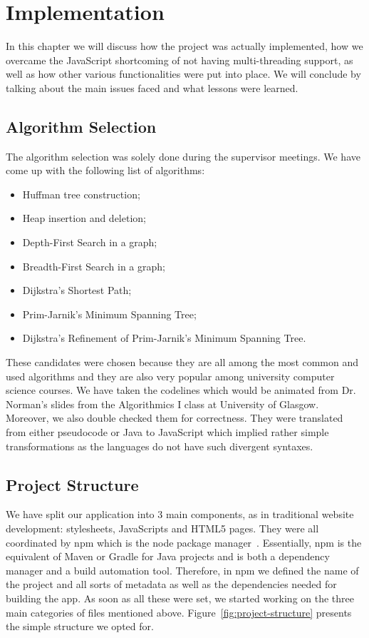 \documentclass{l4proj}
\begin{document}
\chapter{Implementation}
\label{implementation}

In this chapter we will discuss how the project was actually implemented, how we overcame the
JavaScript shortcoming of not having multi-threading support, as well as how other various functionalities were put
into place. We will conclude by talking about the main issues faced and what lessons were learned. 

\section{Algorithm Selection}

The algorithm selection was solely done during the supervisor meetings. We have come up with the following list of algorithms:

\begin{itemize}
    \item Huffman tree construction;
    \item Heap insertion and deletion;
    \item Depth-First Search in a graph;
    \item Breadth-First Search in a graph;
    \item Dijkstra's Shortest Path;
    \item Prim-Jarnik's Minimum Spanning Tree;
    \item Dijkstra's Refinement of Prim-Jarnik's Minimum Spanning Tree.
\end{itemize}

These candidates were chosen because they are all among the most common and used algorithms and they are also very
popular among university computer science courses. We have taken the codelines which would be animated from Dr.
Norman's slides from the Algorithmics I class at University of Glasgow. Moreover, we also double checked them for correctness. They were translated from either pseudocode or Java to JavaScript which implied rather simple transformations as
the languages do not have such divergent syntaxes. 

\section{Project Structure}

We have split our application into 3 main components, as in traditional website development: stylesheets, JavaScripts
and HTML5 pages. They were all coordinated by npm which is the node package manager~\cite{npm}. Essentially,
npm is the equivalent of Maven or Gradle for Java projects and  is both a dependency manager and a build automation
tool. Therefore, in npm we defined the name of the project and all sorts of metadata as well as the dependencies needed
for building the app. As soon as all these were set, we started working on the three main categories of files mentioned
above. Figure~\ref{fig:project-structure} presents the simple structure we opted for.
\end{document}
